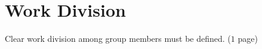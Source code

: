 
\chapter{Work Division}
\label{Chapter7}

Clear work division among group members must be defined. 
($1$ page)